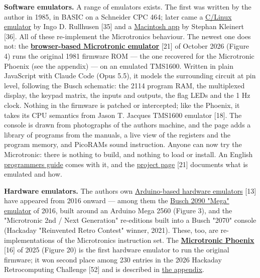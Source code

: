 \documentclass[
  11pt,
  letterpaper,
]{article}
\begin{document}
\textbf{Software emulators.} A range of emulators exists. The first was
written by the author in 1985, in BASIC on a Schneider CPC 464; later
came a \href{https://freeshell.de/~d01c/micsim_0.1.0.tar.xz}{C/Linux
emulator} by Ingo D. Rullhusen {[}35{]} and a
\href{https://download.cnet.com/2090-emulator/3000-2072_4-47314.html}{Macintosh
app} by Stephan Kleinert {[}36{]}. All of these re-implement the
Microtronic\textquotesingle s behaviour. The newest one does not: the
\href{https://lambdamikel.github.io/microtronic-emulator/}{\textbf{browser-based
Microtronic emulator}} {[}21{]} of October 2026 (Figure 4) runs the
original 1981 firmware ROM --- the one recovered for the Microtronic
Phoenix (see the appendix) --- on an emulated TMS1600. Written in plain
JavaScript with Claude Code (Opus 5.5), it models the surrounding
circuit at pin level, following the Busch schematic: the 2114 program
RAM, the multiplexed display, the keypad matrix, the inputs and outputs,
the flag LEDs and the 1 Hz clock. Nothing in the firmware is patched or
intercepted; like the Phoenix, it takes its CPU semantics from Jason T.
Jacques\textquotesingle{} TMS1600 emulator {[}18{]}. The console is
drawn from photographs of the author\textquotesingle s machine, and the
page adds a library of programs from the manuals, a live view of the
registers and the program memory, and PicoRAM\textquotesingle s sound
instruction. Anyone can now try the Microtronic: there is nothing to
build, and nothing to load or install. An English
\href{https://lambdamikel.github.io/microtronic-emulator/guide.html}{programmer\textquotesingle s
guide} comes with it, and the
\href{https://github.com/lambdamikel/microtronic-emulator}{project page}
{[}21{]} documents what is emulated and how.

\textbf{Hardware emulators.} The author\textquotesingle s own
\href{https://github.com/lambdamikel/Busch-2090}{Arduino-based hardware
emulators} {[}13{]} have appeared from 2016 onward --- among them the
\href{https://github.com/lambdamikel/Busch-2090/tree/master/busch2090-mega-v4}{Busch
2090 "Mega" emulator} of 2016, built around an Arduino Mega 2560 (Figure
3), and the "Microtronic 2nd / Next Generation" re-editions built into a
Busch "2070" console (Hackaday "Reinvented Retro Contest" winner, 2021).
These, too, are re-implementations of the Microtronic\textquotesingle s
instruction set. The
\href{https://github.com/lambdamikel/microtronic-phoenix}{\textbf{Microtronic
Phoenix}} {[}16{]} of 2025 (Figure 20) is the first hardware emulator to
run the original firmware; it won second place among 230 entries in the
2026 Hackaday Retrocomputing Challenge {[}52{]} and is described in
\hyperref[appendix-the-microtronic-phoenix]{the appendix}.
\end{document}
